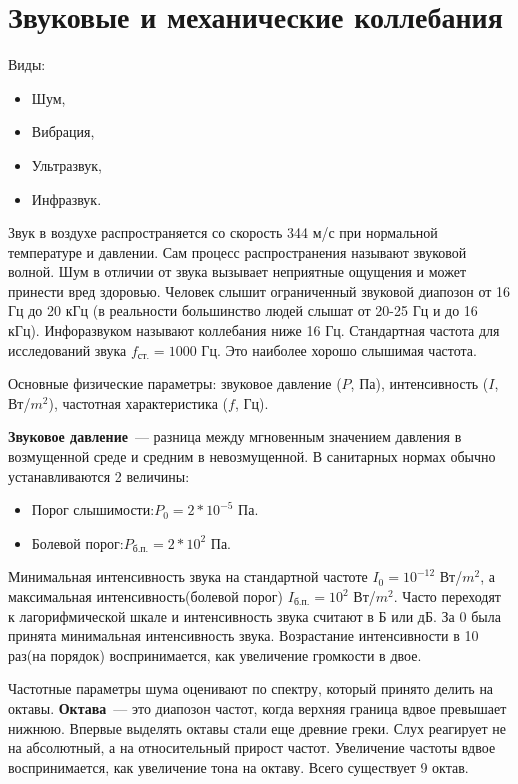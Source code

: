 \section{Звуковые и механические коллебания}
Виды:
\begin{itemize}
	\item Шум,
	\item Вибрация,
	\item Ультразвук,
	\item Инфразвук.
\end{itemize}
Звук в воздухе распространяется со скорость 344 м/с при нормальной температуре и давлении. Сам процесс распространения называют звуковой волной. Шум в отличии от звука вызывает неприятные ощущения и может принести вред здоровью. Человек слышит ограниченный звуковой диапозон от 16 Гц до 20 кГц (в реальности большинство людей слышат от 20-25 Гц и до 16 кГц). Инфоразвуком называют коллебания ниже 16 Гц. Стандартная частота для исследований звука $f_{\text{ст.}}=1000$ Гц. Это наиболее хорошо слышимая частота.

Основные физические параметры: звуковое давление ($P$, Па), интенсивность ($I$, Вт/$m^2$), частотная характеристика ($f$, Гц).

\textbf{Звуковое давление}~--- разница между мгновенным значением давления в возмущенной среде и средним в невозмущенной.
В санитарных нормах обычно устанавливаются 2 величины:
\begin{itemize}
	\item Порог слышимости:$P_0=2*10^{-5}$ Па.
	\item Болевой порог:$P_{\text{б.п.}}=2*10^2$ Па.
\end{itemize}

Минимальная интенсивность звука на стандартной частоте $I_0=10^{-12}$ Вт/$m^2$, а максимальная интенсивность(болевой порог) $I_{\text{б.п.}}=10^2$ Вт/$m^2$. Часто переходят к лагорифмической шкале и интенсивность звука считают в Б или дБ. За 0 была принята минимальная интенсивность звука. Возрастание интенсивности в 10 раз(на порядок) воспринимается, как увеличение громкости в двое.

Частотные параметры шума оценивают по спектру, который принято делить на октавы. \textbf{Октава}~--- это диапозон частот, когда верхняя граница вдвое превышает нижнюю. Впервые выделять октавы стали еще древние греки. Слух реагирует не на абсолютный, а на относительный прирост частот. Увеличение частоты вдвое воспринимается, как увеличение тона на октаву. Всего существует 9 октав.

